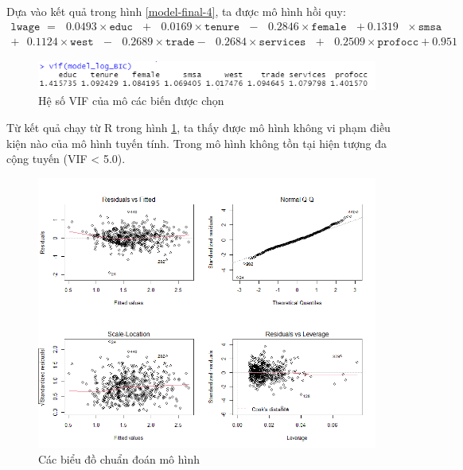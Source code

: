 Dựa vào kết quả trong hình \ref{model-final-4}, ta được mô hình hồi quy:
\begin{equation*}
\begin{multlined}
	\texttt{lwage } = \text{ } 0.0493\times \texttt{educ} \text{ } + \text{ } 0.0169 \times \texttt{tenure} \text{ }-\text{ }0.2846 \times \texttt{female} \text{ } + 0.1319 \text{ } \times \texttt{smsa} \text{ } \\
	+\text{ }0.1124 \times\texttt{west}\text{ } -\text{ }0.2689\times \texttt{trade} -\text{ }0.2684 \times \texttt{services} \text{ } + \text{ }0.2509\times \texttt{profocc} + 0.951
\end{multlined}
\end{equation*}

\begin{figure}[H]
	\centering
	\includegraphics[width=\textwidth]{../Photo Of Result/vif-4}	
	\caption{Hệ số VIF của mô các biến được chọn}
	\label{vif}
\end{figure}

Từ kết quả chạy từ R trong hình \ref{vif}, ta thấy được mô hình không vi phạm điều kiện nào của mô hình tuyến tính. Trong mô hình không tồn tại hiện tượng đa cộng tuyến (VIF < 5.0).

\begin{figure}[H]
	\includegraphics[width=\textwidth]{../Photo Of Result/diagnostic-plot-4}
	\caption{Các biểu đồ chuẩn đoán mô hình}
	\label{diagnostic}
\end{figure}

